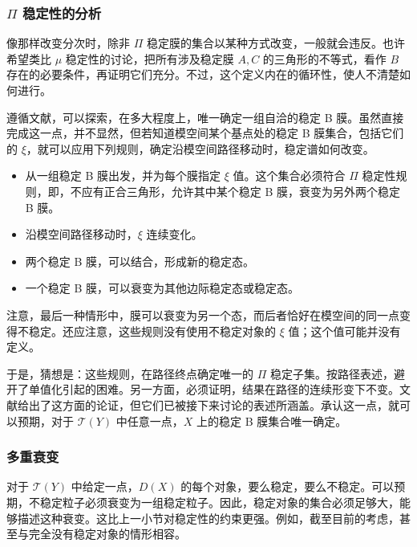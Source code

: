 \subsubsection{\texorpdfstring{$\Pi$}{Π} 稳定性的分析}\label{sec:5.5.4.1}

像那样改变分次时，除非 $\Pi$ 稳定膜的集合以某种方式改变，一般就会违反。也许希望类比 $\mu$ 稳定性的讨论，把所有涉及稳定膜 $A,C$ 的三角形的不等式，看作 $B$ 存在的必要条件，再证明它们充分。不过，这个定义内在的循环性，使人不清楚如何进行。

遵循文献，可以探索，在多大程度上，唯一确定一组自洽的稳定 B 膜。虽然直接完成这一点，并不显然，但若知道模空间某个基点处的稳定 B 膜集合，包括它们的 $\xi$，就可以应用下列规则，确定沿模空间路径移动时，稳定谱如何改变。
\begin{itemize}
\item 从一组稳定 B 膜出发，并为每个膜指定 $\xi$ 值。这个集合必须符合 $\Pi$ 稳定性规则，即，不应有正合三角形，允许其中某个稳定 B 膜，衰变为另外两个稳定 B 膜。
\item 沿模空间路径移动时，$\xi$ 连续变化。
\item 两个稳定 B 膜，可以结合，形成新的稳定态。
\item 一个稳定 B 膜，可以衰变为其他边际稳定态或稳定态。
\end{itemize}
注意，最后一种情形中，膜可以衰变为另一个态，而后者恰好在模空间的同一点变得不稳定。还应注意，这些规则没有使用不稳定对象的 $\xi$ 值；这个值可能并没有定义。

于是，猜想是：这些规则，在路径终点确定唯一的 $\Pi$ 稳定子集。按路径表述，避开了单值化引起的困难。另一方面，必须证明，结果在路径的连续形变下不变。文献给出了这方面的论证，但它们已被接下来讨论的表述所涵盖。承认这一点，就可以预期，对于 $\mathcal{T}(Y)$ 中任意一点，$X$ 上的稳定 B 膜集合唯一确定。

\subsubsection{多重衰变}\label{sec:5.5.4.2}

对于 $\mathcal{T}(Y)$ 中给定一点，$D(X)$ 的每个对象，要么稳定，要么不稳定。可以预期，不稳定粒子必须衰变为一组稳定粒子。因此，稳定对象的集合必须足够大，能够描述这种衰变。这比上一小节对稳定性的约束更强。例如，截至目前的考虑，甚至与完全没有稳定对象的情形相容。

